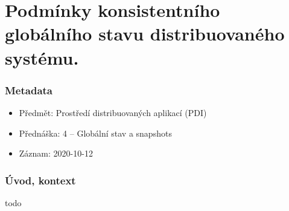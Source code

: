 

\chapter{Podmínky konsistentního globálního stavu distribuovaného systému.}

\subsection*{Metadata}

\begin{itemize}
    \item Předmět: Prostředí distribuovaných aplikací (PDI)
    \item Přednáška: 4 -- Globální stav a snapshots
    \item Záznam: 2020-10-12
\end{itemize}

\subsection*{Úvod, kontext}

todo
